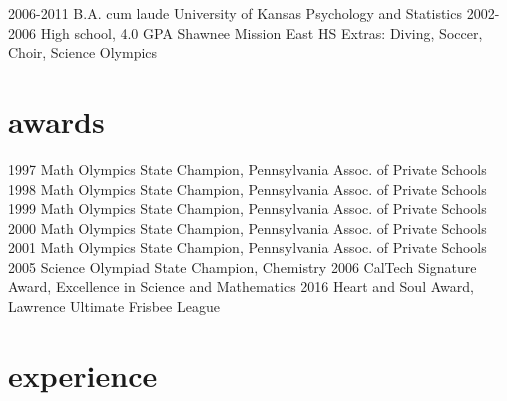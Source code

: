 \documentclass[]{twentysecondcv}
\begin{document}
\begin{twenty}
  \twentyitem
    {2006-2011}
    {B.A. cum laude}
    {University of Kansas}
    {Psychology and Statistics}
  \twentyitem
    {2002-2006}
    {High school, 4.0 GPA}
    {Shawnee Mission East HS}
    {Extras: Diving, Soccer, Choir, Science Olympics}
\end{twenty}



\section{awards}

\begin{twentyshort}
  \twentyitemshort
    {1997}
    {Math Olympics State Champion, Pennsylvania Assoc. of Private Schools}
  \twentyitemshort
    {1998}
    {Math Olympics State Champion, Pennsylvania Assoc. of Private Schools}
  \twentyitemshort
    {1999}
    {Math Olympics State Champion, Pennsylvania Assoc. of Private Schools}
  \twentyitemshort
    {2000}
    {Math Olympics State Champion, Pennsylvania Assoc. of Private Schools}
  \twentyitemshort
    {2001}
    {Math Olympics State Champion, Pennsylvania Assoc. of Private Schools}
  \twentyitemshort
    {2005}
    {Science Olympiad State Champion, Chemistry}
  \twentyitemshort
    {2006}
    {CalTech Signature Award, Excellence in Science and Mathematics}
  \twentyitemshort
    {2016}
    {Heart and Soul Award, Lawrence Ultimate Frisbee League}
\end{twentyshort}


\section{experience}
\end{document}
